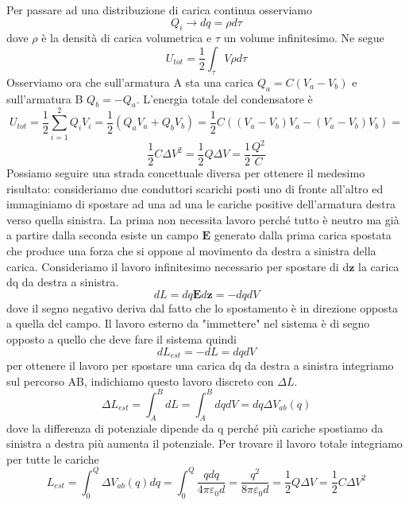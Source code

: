 \documentclass[
10pt, %
a4paper, %
oneside, %
headinclude,footinclude, %
BCOR5mm, %
]{scrartcl}
\begin{document}
Per passare ad una distribuzione di carica continua osserviamo
\[Q_i \to dq = \rho d\tau\]
dove $\rho$ è la densità di carica volumetrica e $\tau$ un volume infinitesimo. Ne segue
\[U_{tot} = \frac{1}{2}\int_{\tau} V\rho d\tau\]
Osserviamo ora che sull'armatura A sta una carica \(Q_a = C(V_a - V_b)\) e sull'armatura B \(Q_b = - Q_a\). L'energia totale del condensatore è
\[U_{tot} = \frac{1}{2}\sum_{i=1}^{2} Q_i V_i = \frac{1}{2} (Q_a V_a + Q_b V_b)= \frac{1}{2}C((V_a - V_b) V_a - (V_a - V_b) V_b) = \]
\[\frac{1}{2}C\Delta V^2 = \frac{1}{2}Q\Delta V = \frac{1}{2}\frac{Q^2}{C}\]
Possiamo seguire una strada concettuale diversa per ottenere il medesimo risultato: consideriamo due conduttori scarichi posti uno di fronte all'altro ed immaginiamo di spostare ad una ad una le cariche positive dell'armatura destra verso quella sinistra. La prima non necessita lavoro perché tutto è neutro ma già a partire dalla seconda esiste un campo $\mathbf{E}$ generato dalla prima carica spostata che produce una forza che si oppone al movimento da destra a sinistra della carica. Consideriamo il lavoro infinitesimo necessario per spostare di d$\mathbf{z}$ la carica dq da destra a sinistra. 
\[dL = dq\mathbf{E}d\mathbf{z} = -dqdV \]
dove il segno negativo deriva dal fatto che lo spostamento è in direzione opposta a quella del campo. Il lavoro esterno da "immettere" nel sistema è di segno opposto a quello che deve fare il sistema quindi
\[dL_{est} = -dL = dqdV\]
per ottenere il lavoro per spostare una carica dq da destra a sinistra integriamo sul percorso AB, indichiamo questo lavoro discreto con \(\Delta L\).
\[\Delta L_{est} = \int_{A}^{B} dL = \int_{A}^{B} dqdV = dq \Delta V_{ab}(q) \]
dove la differenza di potenziale dipende da q perché più cariche spostiamo da sinistra a destra più aumenta il potenziale. Per trovare il lavoro totale integriamo per tutte le cariche
\[L_{est} = \int_0^Q  \Delta V_{ab}(q) dq= \int_0^Q \frac{qdq}{4\pi\varepsilon_0 d} = \frac{q^2}{8\pi\varepsilon_0 d} = \frac{1}{2}Q\Delta V = \frac{1}{2} C \Delta V^2\]
\end{document}

